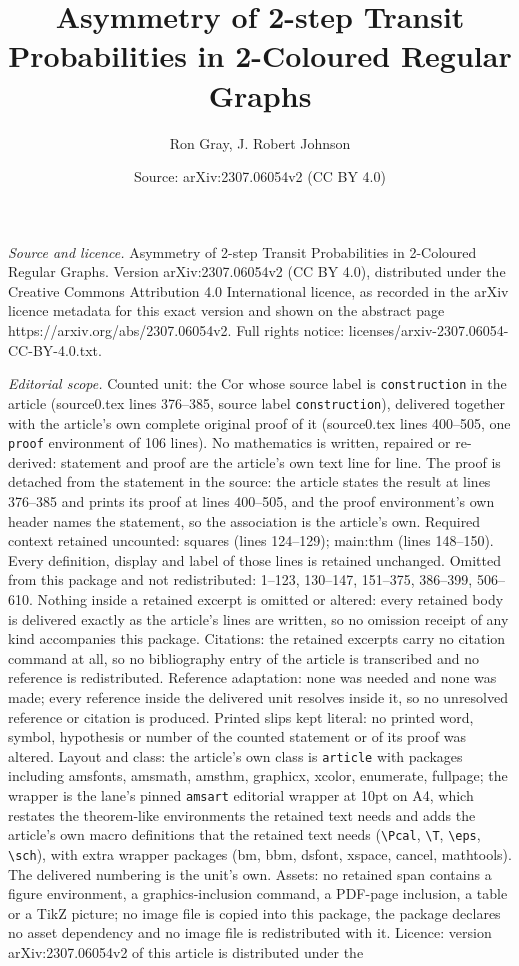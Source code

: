 \documentclass[10pt,a4paper]{amsart}
\title[Asymmetry of 2-step Transit Probabilities in 2-Coloured Regu]{Asymmetry of 2-step Transit Probabilities in 2-Coloured Regular Graphs}
\author{Ron Gray, J. Robert Johnson}
\date{Source: arXiv:2307.06054v2 (CC BY 4.0)}
\begin{document}
\maketitle

\noindent\emph{Source and licence.} Asymmetry of 2-step Transit Probabilities in 2-Coloured Regular Graphs. Version arXiv:2307.06054v2 (CC BY 4.0), distributed under the Creative Commons Attribution 4.0 International licence, as recorded in the arXiv licence metadata for this exact version and shown on the abstract page https://arxiv.org/abs/2307.06054v2. Full rights notice: licenses/arxiv-2307.06054-CC-BY-4.0.txt.\par\smallskip

\noindent\textit{Editorial scope.} Counted unit: the Cor whose source label is \texttt{construction} in the article (source0.tex lines 376--385, source label \texttt{construction}), delivered together with the article's own complete original proof of it (source0.tex lines 400--505, one \texttt{proof} environment of 106 lines). No mathematics is written, repaired or re-derived: statement and proof are the article's own text line for line. The proof is detached from the statement in the source: the article states the result at lines 376--385 and prints its proof at lines 400--505, and the proof environment's own header names the statement, so the association is the article's own. Required context retained uncounted: squares (lines 124--129); main:thm (lines 148--150). Every definition, display and label of those lines is retained unchanged. Omitted from this package and not redistributed: 1--123, 130--147, 151--375, 386--399, 506--610. Nothing inside a retained excerpt is omitted or altered: every retained body is delivered exactly as the article's lines are written, so no omission receipt of any kind accompanies this package. Citations: the retained excerpts carry no citation command at all, so no bibliography entry of the article is transcribed and no reference is redistributed. Reference adaptation: none was needed and none was made; every reference inside the delivered unit resolves inside it, so no unresolved reference or citation is produced. Printed slips kept literal: no printed word, symbol, hypothesis or number of the counted statement or of its proof was altered. Layout and class: the article's own class is \texttt{article} with packages including amsfonts, amsmath, amsthm, graphicx, xcolor, enumerate, fullpage; the wrapper is the lane's pinned \texttt{amsart} editorial wrapper at 10pt on A4, which restates the theorem-like environments the retained text needs and adds the article's own macro definitions that the retained text needs (\texttt{\textbackslash Pcal}, \texttt{\textbackslash T}, \texttt{\textbackslash eps}, \texttt{\textbackslash sch}), with extra wrapper packages (bm, bbm, dsfont, xspace, cancel, mathtools). The delivered numbering is the unit's own. Assets: no retained span contains a figure environment, a graphics-inclusion command, a PDF-page inclusion, a table or a TikZ picture; no image file is copied into this package, the package declares no asset dependency and no image file is redistributed with it. Licence: version arXiv:2307.06054v2 of this article is distributed under the 
\end{document}
